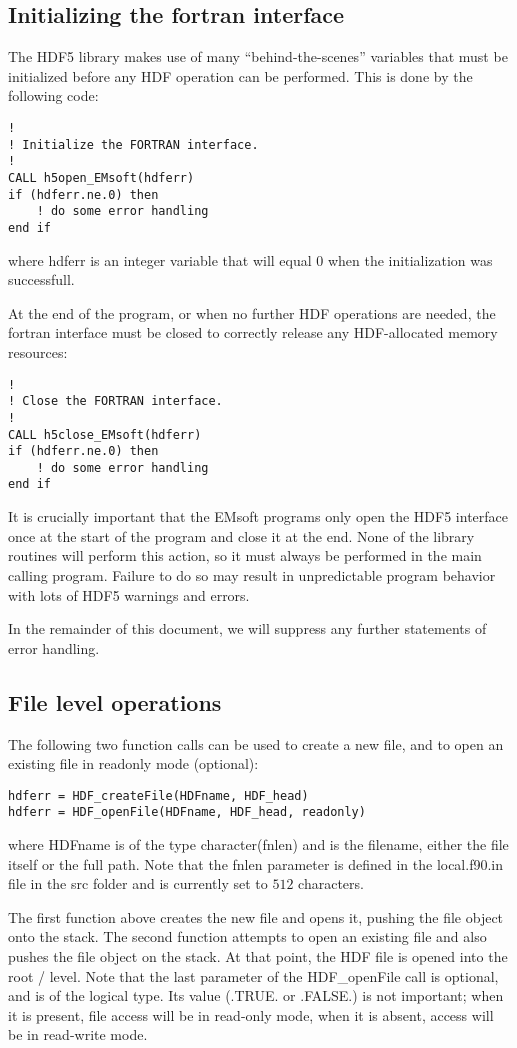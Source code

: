 \documentclass[DIV=calc, paper=letter, fontsize=11pt]{scrartcl}	 %
\begin{document}
\subsection{Initializing the fortran interface}
The HDF5 library makes use of many ``behind-the-scenes'' variables that must be initialized before
any HDF operation can be performed. This is done by the following code:
\begin{verbatim}
!
! Initialize the FORTRAN interface.
!
CALL h5open_EMsoft(hdferr)
if (hdferr.ne.0) then
    ! do some error handling
end if
\end{verbatim}
where \textsf{hdferr} is an integer variable that will equal $0$ when the initialization was successfull.

At the end of the program, or when no further HDF operations are needed, the fortran interface must be 
closed to correctly release any HDF-allocated memory resources:
\begin{verbatim}
!
! Close the FORTRAN interface.
!
CALL h5close_EMsoft(hdferr)
if (hdferr.ne.0) then
    ! do some error handling
end if
\end{verbatim}
It is crucially important that the \textsf{EMsoft} programs only open the HDF5 interface once at the start of 
the program and close it at the end.  None of the library routines will perform this action, so it must always
be performed in the main calling program.  Failure to do so may result in unpredictable program behavior
with lots of HDF5 warnings and errors.
 
In the remainder of this document, we will suppress any further statements of error handling.


\subsection{File level operations}
The following two function calls can be used to create a new file, and to open an existing file in readonly mode (optional):
\begin{verbatim}
hdferr = HDF_createFile(HDFname, HDF_head)
hdferr = HDF_openFile(HDFname, HDF_head, readonly)
\end{verbatim}
where \textsf{HDFname} is of the type \textsf{character(fnlen)} and is the filename, either the file itself or the full path.
Note that the \textsf{fnlen} parameter is defined in the \textsf{local.f90.in} file in the \textsf{src} folder and is currently set
to $512$ characters.

The first function above creates the new file and opens it, pushing the file object onto the stack.  The second function
attempts to open an existing file and also pushes the file object on the stack.  At that point, the HDF file is opened into
the root \textsf{/} level.  Note that the last parameter of the \textsf{HDF\_openFile} call is optional, and is of the \textsf{logical} type.
Its value (.TRUE. or .FALSE.) is not important; when it is present, file access will be in read-only mode, when it is absent, access will be in read-write mode.
\end{document}
